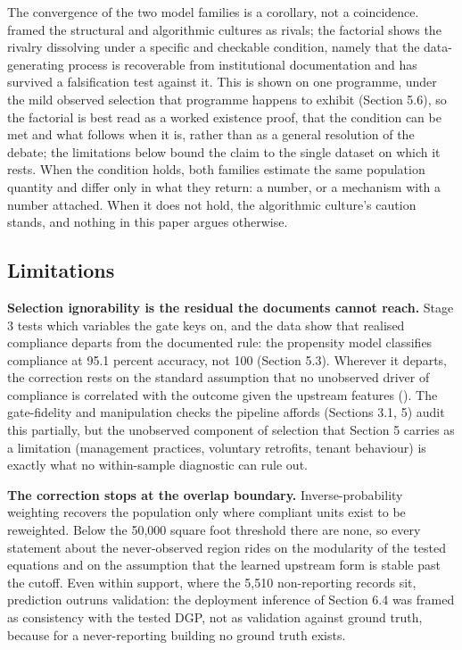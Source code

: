 The convergence of the two model families is a corollary, not a coincidence.  framed the structural and algorithmic cultures as rivals; the factorial shows the rivalry dissolving under a specific and checkable condition, namely that the data-generating process is recoverable from institutional documentation and has survived a falsification test against it. This is shown on one programme, under the mild observed selection that programme happens to exhibit (Section 5.6), so the factorial is best read as a worked existence proof, that the condition can be met and what follows when it is, rather than as a general resolution of the debate; the limitations below bound the claim to the single dataset on which it rests. When the condition holds, both families estimate the same population quantity and differ only in what they return: a number, or a mechanism with a number attached. When it does not hold, the algorithmic culture's caution stands, and nothing in this paper argues otherwise.

\subsection{Limitations}

\textbf{Selection ignorability is the residual the documents cannot reach.} Stage 3 tests which variables the gate keys on, and the data show that realised compliance departs from the documented rule: the propensity model classifies compliance at 95.1 percent accuracy, not 100 (Section 5.3). Wherever it departs, the correction rests on the standard assumption that no unobserved driver of compliance is correlated with the outcome given the upstream features (). The gate-fidelity and manipulation checks the pipeline affords (Sections 3.1, 5) audit this partially, but the unobserved component of selection that Section 5 carries as a limitation (management practices, voluntary retrofits, tenant behaviour) is exactly what no within-sample diagnostic can rule out.

\textbf{The correction stops at the overlap boundary.} Inverse-probability weighting recovers the population only where compliant units exist to be reweighted. Below the 50,000 square foot threshold there are none, so every statement about the never-observed region rides on the modularity of the tested equations and on the assumption that the learned upstream form is stable past the cutoff. Even within support, where the 5,510 non-reporting records sit, prediction outruns validation: the deployment inference of Section 6.4 was framed as consistency with the tested DGP, not as validation against ground truth, because for a never-reporting building no ground truth exists.


